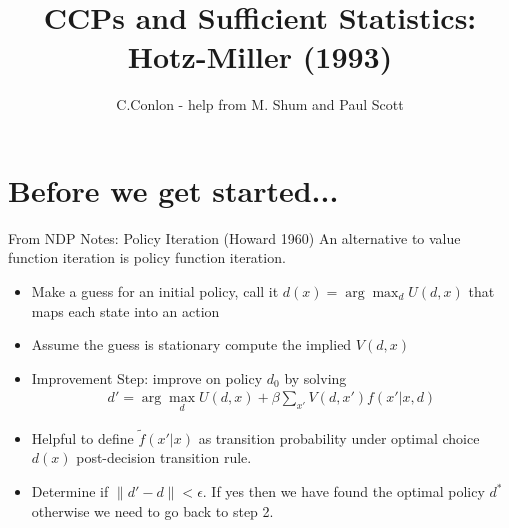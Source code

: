 

\title{CCPs and Sufficient Statistics: Hotz-Miller (1993)}
\author{C.Conlon - help from M. Shum and Paul Scott}
\date{}


\begin{frame}
\titlepage
\end{frame}


\section{Before we get started...}

\begin{frame}{From NDP Notes: Policy Iteration (Howard 1960)}
An alternative to value function iteration is policy function iteration. 
\begin{itemize}
\item Make a guess for an initial policy, call it $d(x) = \arg \max_d U(d,x)$ that maps each state into an action
\item Assume the guess is stationary compute the implied $V(d,x)$
\item Improvement Step: improve on policy $d_0$ by solving 
\begin{eqnarray*}
d' = \arg \max_d U(d,x) + \beta \sum_{x'} V(d,x') f (x' | x,d)
\end{eqnarray*}
\item Helpful to define $\tilde{f}(x' | x)$ as transition probability under optimal choice $d(x)$ \alert{post-decision transition rule}.
\item Determine if $\| d' -d\| < \epsilon$. If yes then we have found the optimal policy $d^* $ otherwise we need to go back to step 2.
\end{itemize}
\end{frame}

